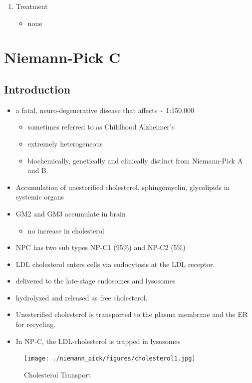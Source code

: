 \documentclass{scrartcl}
\begin{document}
\begin{enumerate}
\item Treatment
\label{sec:org5e8d759}
\begin{itemize}
\item none
\end{itemize}
\end{enumerate}
\section{Niemann-Pick C}
\label{sec:orgb796ab7}
\subsection{Introduction}
\label{sec:org7f23aea}
\begin{itemize}
\item a fatal, neuro-degenerative disease that affects \textasciitilde{} 1:150,000
\begin{itemize}
\item sometimes referred to as Childhood Alzheimer’s
\item extremely heterogeneous
\item biochemically, genetically and clinically distinct from Niemann-Pick A and B.
\end{itemize}
\item Accumulation of unesterified cholesterol, sphingomyelin, glycolipids in systemic organs
\item GM2 and GM3 accumulate in brain
\begin{itemize}
\item no increase in cholesterol
\end{itemize}
\item NPC has two sub types NP-C1 (95\%) and NP-C2 (5\%)

\item LDL cholesterol enters cells via endocytosis at the LDL receptor.
\item delivered to the late-stage endosomes and lysosomes
\item hydrolyzed and released as free cholesterol.
\item Unesterified cholesterol is transported to the plasma membrane and the ER for recycling.

\item In NP-C, the LDL-cholesterol is trapped in lysosomes
\end{itemize}

\begin{figure}[htbp]
\centering
\texttt{[image: ./niemann\_pick/figures/cholesterol1.jpg]}
\caption{\label{fig:org62ba7cb}
Cholesterol Transport}
\end{figure}
\end{document}
